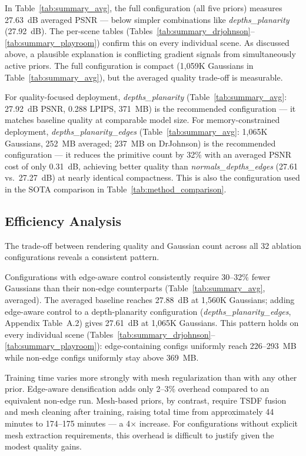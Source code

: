 In Table~\ref{tab:summary_avg}, the full configuration (all five priors) measures 27.63~dB averaged PSNR — below simpler combinations like \textit{depths\_\allowbreak planarity} (27.92~dB). The per-scene tables (Tables~\ref{tab:summary_drjohnson}--\ref{tab:summary_playroom}) confirm this on every individual scene. As discussed above, a plausible explanation is conflicting gradient signals from simultaneously active priors. The full configuration is compact (1,059K Gaussians in Table~\ref{tab:summary_avg}), but the averaged quality trade-off is measurable.

For quality-focused deployment, \textit{depths\_\allowbreak planarity} (Table~\ref{tab:summary_avg}: 27.92~dB PSNR, 0.288 LPIPS, 371~MB) is the recommended configuration — it matches baseline quality at comparable model size. For memory-constrained deployment, \textit{depths\_\allowbreak planarity\_\allowbreak edges} (Table~\ref{tab:summary_avg}: 1{,}065K Gaussians, 252~MB averaged; 237~MB on DrJohnson) is the recommended configuration — it reduces the primitive count by 32\% with an averaged PSNR cost of only 0.31~dB, achieving better quality than \textit{normals\_\allowbreak depths\_\allowbreak edges} (27.61 vs.\ 27.27~dB) at nearly identical compactness. This is also the configuration used in the SOTA comparison in Table~\ref{tab:method_comparison}.

\subsection{Efficiency Analysis}

The trade-off between rendering quality and Gaussian count across all 32 ablation configurations reveals a consistent pattern.

Configurations with edge-aware control consistently require 30--32\% fewer Gaussians than their non-edge counterparts (Table~\ref{tab:summary_avg}, averaged). The averaged baseline reaches 27.88~dB at 1,560K Gaussians; adding edge-aware control to a depth-planarity configuration (\textit{depths\_\allowbreak planarity\_\allowbreak edges}, Appendix Table~A.2) gives 27.61~dB at 1,065K Gaussians. This pattern holds on every individual scene (Tables~\ref{tab:summary_drjohnson}--\ref{tab:summary_playroom}): edge-containing configs uniformly reach 226--293~MB while non-edge configs uniformly stay above 369~MB.

Training time varies more strongly with mesh regularization than with any other prior. Edge-aware densification adds only 2--3\% overhead compared to an equivalent non-edge run. Mesh-based priors, by contrast, require TSDF fusion and mesh cleaning after training, raising total time from approximately 44 minutes to 174--175 minutes — a 4$\times$ increase. For configurations without explicit mesh extraction requirements, this overhead is difficult to justify given the modest quality gains.


